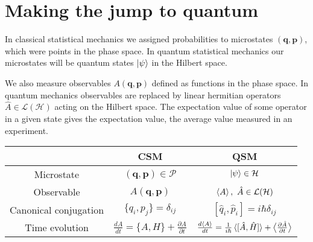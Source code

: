 \documentclass[a4paper,11pt,oneside]{book}
\begin{document}
\section{Making the jump to quantum}
In classical statistical mechanics we assigned probabilities to microstates $(\textbf{q},\textbf{p})$, which were points in the phase space. In quantum statistical mechanics our microstates will be quantum states $\ket{\psi}$ in the Hilbert space. 

We also measure observables $A(\textbf{q},\textbf{p})$ defined as functions in the phase space. In quantum mechanics observables are replaced by linear hermitian operators $\hat{A} \in \mathcal{L}(\mathcal{H})$ acting on the Hilbert space. The expectation value of some operator in a given state gives the expectation value, the average value measured in an experiment.
\begin{table}[h!]
    \centering
    \begin{tabular}{c|c|c}
                 & CSM  & QSM \\
                 \hline
      Microstate &
      $(\textbf{q},\textbf{p}) \in \mathcal{P}$& $\ket{\psi} \in \mathcal{H}$\\
       Observable & $A(\textbf{q},\textbf{p})$ & $\braket{A}, \ \hat{A} \in \mathcal{L}(\mathcal{H})$\\
    Canonical conjugation & $\{q_i,p_j\} = \delta_{ij}$ & $[\hat{q}_i,\hat{p}_i] = i \hbar \delta_{ij}$\\
    Time evolution & $\frac{dA}{dt} = \{A,H\} + \frac{\partial A}{\partial t}$ & $\frac{d\braket{A}}{dt} = \frac{1}{i\hbar} \braket{[\hat{A},\hat{H}]} + \big \langle \frac{\partial \hat{A}}{\partial t}\big\rangle$
        \end{tabular}
\end{table}
\end{document}
